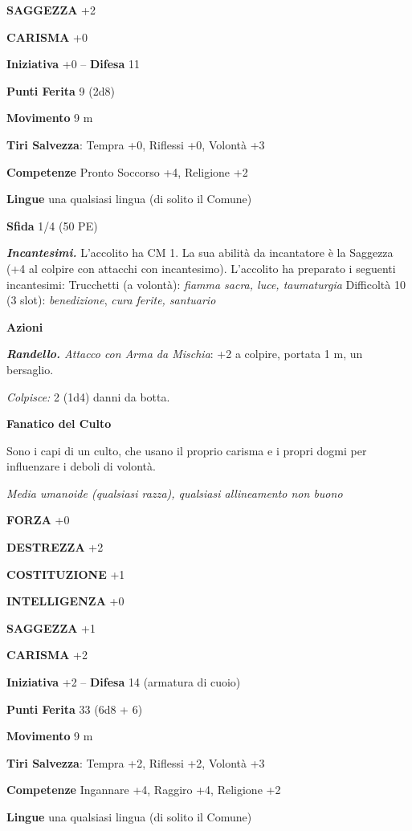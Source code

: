 \begin{multicols}{2}
\textbf{SAGGEZZA} +2

\textbf{CARISMA} +0

\textbf{Iniziativa} +0 -- \textbf{Difesa} 11

\textbf{Punti Ferita} 9 (2d8)

\textbf{Movimento} 9 m

\textbf{Tiri Salvezza}: Tempra +0, Riflessi +0, Volontà +3 

\textbf{Competenze} Pronto Soccorso +4, Religione +2

\textbf{Lingue} una qualsiasi lingua (di solito il Comune)

\textbf{Sfida} 1/4 (50 PE)

\emph{\textbf{Incantesimi.}} L'accolito ha CM 1. La sua abilità da incantatore è la Saggezza (+4 al colpire con attacchi con incantesimo). L'accolito ha preparato i seguenti incantesimi: Trucchetti (a volontà): \emph{fiamma sacra, luce, taumaturgia} Difficoltà 10 (3 slot): \emph{benedizione}, \emph{cura ferite, santuario}

\medskip\textbf{Azioni}

\emph{\textbf{Randello.} Attacco con Arma da Mischia}: +2 a colpire, portata 1 m, un bersaglio.

\emph{Colpisce:} 2 (1d4) danni da botta.

\textbf{Fanatico del Culto}

Sono i capi di un culto, che usano il proprio carisma e i propri dogmi per influenzare i deboli di volontà.

\emph{Media umanoide (qualsiasi razza), qualsiasi allineamento non buono}

\textbf{FORZA} +0

\textbf{DESTREZZA} +2

\textbf{COSTITUZIONE} +1

\textbf{INTELLIGENZA} +0

\textbf{SAGGEZZA} +1

\textbf{CARISMA} +2

\textbf{Iniziativa} +2 -- \textbf{Difesa} 14 (armatura di cuoio)

\textbf{Punti Ferita} 33 (6d8 + 6)

\textbf{Movimento} 9 m

\textbf{Tiri Salvezza}: Tempra +2, Riflessi +2, Volontà +3 

\textbf{Competenze} Ingannare +4, Raggiro +4, Religione +2 

\textbf{Lingue} una qualsiasi lingua (di solito il Comune)


\end{multicols}

